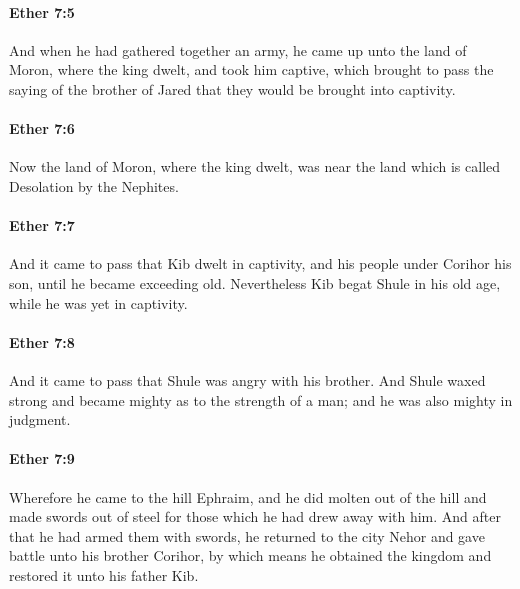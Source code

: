 		\paragraph{Ether 7:5} %
			\label{ETHER-7-5}

			And when he had gathered together an army,
			he came up unto the land of Moron, where the king dwelt, and took him captive,
			which brought to pass the saying of the brother of Jared
			that they would be brought into captivity.

		\paragraph{Ether 7:6} %
			\label{ETHER-7-6}

			Now the land of Moron, where the king dwelt, was near the land
			which is called Desolation by the Nephites.

		\paragraph{Ether 7:7} %
			\label{ETHER-7-7}

			And it came to pass that Kib dwelt in captivity,
			and his people under Corihor his son,
			until he became exceeding old.
			Nevertheless Kib begat Shule in his old age,
			while he was yet in captivity.

		\paragraph{Ether 7:8} %
			\label{ETHER-7-8}

			And it came to pass that Shule was angry with his brother.
			And Shule waxed strong
			and became mighty as to the strength of a man;
			and he was also mighty in judgment.

		\paragraph{Ether 7:9} %
			\label{ETHER-7-9}

			Wherefore he came to the hill Ephraim,
			and he did molten out of the hill and made swords out of steel
			for those which he had drew away with him.
			And after that he had armed them with swords,
			he returned to the city Nehor
			and gave battle unto his brother Corihor,
			by which means he obtained the kingdom
			and restored it unto his father Kib.

